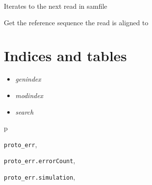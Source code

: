 \documentclass[letterpaper,10pt,english]{sphinxmanual}
\begin{document}
\begin{fulllineitems}
\begin{fulllineitems}
\end{fulllineitems}


\begin{fulllineitems}
\label{index:proto_err.errorCount.errorReader.readNext}
Iterates to the next read in samfile

\end{fulllineitems}


\begin{fulllineitems}
\label{index:proto_err.errorCount.errorReader.refRead}
Get the reference sequence the read is aligned to

\end{fulllineitems}


\end{fulllineitems}



\chapter{Indices and tables}
\label{index:indices-and-tables}\begin{itemize}
\item {} 
\emph{genindex}

\item {} 
\emph{modindex}

\item {} 
\emph{search}

\end{itemize}


\renewcommand{\indexname}{Python Module Index}
\begin{theindex}
\def\bigletter#1{{\Large\sffamily#1}\nopagebreak\vspace{1mm}}
\bigletter{p}
\item {\texttt{proto\_err}}, \pageref{index:module-proto_err}
\item {\texttt{proto\_err.errorCount}}, \pageref{index:module-proto_err.errorCount}
\item {\texttt{proto\_err.simulation}}, \pageref{index:module-proto_err.simulation}
\end{theindex}

\renewcommand{\indexname}{Index}
\printindex
\end{document}
